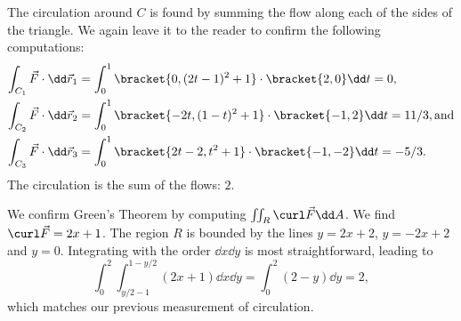 \begin{example}
The circulation around $C$ is found by summing the flow along each of the sides of the triangle. We again leave it to the reader to confirm the following computations:
\begin{align*}
\int_{C_1}\vec F\cdot\dd\vec r_1 &= \int_0^1\bracket{0,(2t-1)^2+1}\cdot\bracket{2,0}\dd t = 0,\\
\int_{C_2}\vec F\cdot\dd\vec r_2 &= \int_0^1\bracket{-2t,(1-t)^2+1}\cdot\bracket{-1,2}\dd t = 11/3, \text{and}\\
\int_{C_3}\vec F\cdot\dd\vec r_3 &= \int_0^1\bracket{2t-2,t^2+1}\cdot\bracket{-1,-2}\dd t = -5/3.
\end{align*}
The circulation is the sum of the flows: $2$.

We confirm Green's Theorem by computing $\iint_R \curl \vec F\dd A$. We find $\curl \vec F = 2x+1$. The region $R$ is bounded by the lines $y = 2x+2$, $y=-2x+2$ and $y=0$. Integrating with the order $\dd x\dd y$ is most straightforward, leading to
\[\int_0^2\int_{y/2-1}^{1-y/2} (2x+1)\dd x\dd y = \int_0^2 (2-y)\dd y = 2,\]
which matches our previous measurement of circulation.
\end{example}

